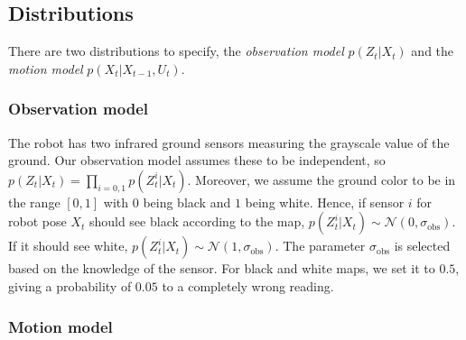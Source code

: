 \documentclass[letterpaper, 10pt, conference]{ieeeconf}
\begin{document}
\subsection{Distributions}

There are two distributions to specify, the \emph{observation model} $p(Z_t | X_t)$ and the \emph{motion model} $p(X_t|X_{t-1}, U_t)$.

\subsubsection{Observation model}

The robot has two infrared ground sensors measuring the grayscale value of the ground.
Our observation model assumes these to be independent, so $p(Z_t | X_t) = \prod_{i=0,1} p(Z_t^{i} | X_t)$.
Moreover, we assume the ground color to be in the range $[0,1]$ with $0$ being black and $1$ being white.
Hence, if sensor $i$ for robot pose $X_t$ should see black according to the map, $p(Z_t^{i} | X_t) \sim \mathcal{N}(0,\sigma_\mathrm{obs})$.
If it should see white, $p(Z_t^{i} | X_t) \sim \mathcal{N}(1,\sigma_\mathrm{obs})$.
The parameter $\sigma_\mathrm{obs}$ is selected based on the knowledge of the sensor.
For black and white maps, we set it to $0.5$, giving a probability of $0.05$ to a completely wrong reading.

\subsubsection{Motion model}
\end{document}
